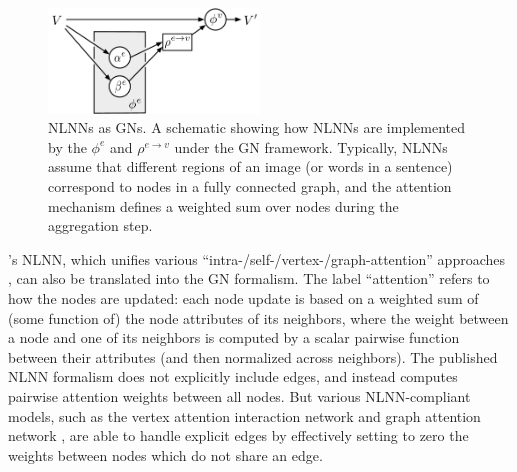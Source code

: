 \begin{figure}[t!]
\centering
\includegraphics[width=0.5\textwidth]{figures/GN-attention}
\caption{NLNNs as GNs. A schematic showing how NLNNs \citep{wang2017non} are implemented by the $\phi^e$ and $\rho^{e\rightarrow v}$ under the GN framework.
Typically, NLNNs assume that different regions of an image (or words in a sentence) correspond to nodes in a fully connected graph, and the attention mechanism defines a weighted sum over nodes during the aggregation step.
}
\label{fig:attention}
\end{figure}

\cite{wang2017non}'s NLNN, which unifies various ``intra-/self-/vertex-/graph-attention'' approaches \citep{lin2017structured,vaswani2017attention,hoshen2017vain,velivckovic2017graph,shaw2018self},
can also be translated into the GN formalism.
The label ``attention'' refers to how the nodes are updated: each node update is based on a weighted sum of (some function of) the node attributes of its neighbors, where the weight between a node and one of its neighbors is computed by a scalar pairwise function between their attributes (and then normalized across neighbors). The published NLNN formalism does not explicitly include edges, and instead computes pairwise attention weights between all nodes. But various NLNN-compliant models, such as the vertex attention interaction network \citep{hoshen2017vain} and graph attention network \citep{velivckovic2017graph}, are able to handle explicit edges by effectively setting to zero the weights between nodes which do not share an edge.

